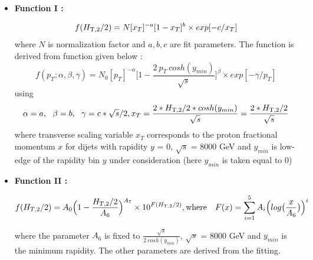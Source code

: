 \begin{itemize}
\item {\bf Function I : }

  \begin{equation}
    \label{eq:func1}
    f(H_{\mathrm{T,2}}/2) = N[x_{T}]^{-a}[1-x_{T}]^{b} \times exp[-c/x_{T}]
  \end{equation}
  where $N$ is normalization factor and $a, b, c$ are fit parameters. The function is derived from function given below \cite{CMS:2011ab} :
  \begin{equation}
    \label{eq:funcderive}
    f(p_{T};\alpha,\beta,\gamma) = N_{0}[p_{T}]^{-\alpha}\bigg[1-\frac{2~p_{T}~cosh(y_{min})}{\sqrt{s}}\bigg]^{\beta} \times exp[-\gamma/p_{T}]
  \end{equation}
  using 
  \begin{equation}
    \alpha = a,~~\beta = b,~~\gamma = c*\sqrt{s}/2, \\
    x_{T} = \frac{2*\httwons *cosh(y_{min})}{\sqrt{s}} = \frac{2*\httwons}{\sqrt{s}}
  \end{equation}
  where transverse scaling variable $x_{T}$ corresponds to the proton fractional momentum $x$ for dijets with rapidity $y$ = 0, $\sqrt{s}$ = 8000 GeV and $y_{min}$ is low-edge of the rapidity bin $y$ under consideration (here $y_{min}$ is taken equal to 0)
  
\item {\bf Function II : }

  \begin{equation}
    \label{eq:func2}
    f(H_{T,2}/2) = A_{0}\Big(1-\frac{H_{T,2}/2}{A_{6}}\Big)^{A_{7}} \times 10^{F(\httwo)}, {\rm where} ~~~{F(x) = \sum\limits_{i=1}^5 A_{i}\Big(log\big(\frac{x}{A_{6}}\big)\Big)^{i}}
  \end{equation}

  where the parameter $A_{6}$ is fixed to $\frac{\sqrt{s}}{2~cosh(y_{min})}$, $\sqrt{s}$ = 8000 GeV and $y_{min}$ is 
  the minimum rapidity. The other parameters are derived from the fitting.
\end{itemize}

